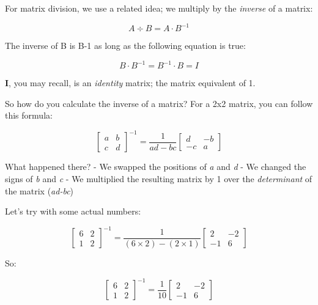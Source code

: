 \documentclass[11pt]{article}
\begin{document}
For matrix division, we use a related idea; we multiply by the
\emph{inverse} of a matrix:

\begin{equation}A \div B = A \cdot B^{-1}\end{equation}

The inverse of B is B-1 as long as the following equation is true:

\begin{equation}B \cdot B^{-1} = B^{-1} \cdot B = I\end{equation}

\textbf{I}, you may recall, is an \emph{identity} matrix; the matrix
equivalent of 1.

So how do you calculate the inverse of a matrix? For a 2x2 matrix, you
can follow this formula:

\begin{equation}\begin{bmatrix}a & b\\c & d\end{bmatrix}^{-1} = \frac{1}{ad-bc}  \begin{bmatrix}d & -b\\-c & a\end{bmatrix}\end{equation}

What happened there? - We swapped the positions of \emph{a} and \emph{d}
- We changed the signs of \emph{b} and \emph{c} - We multiplied the
resulting matrix by 1 over the \emph{determinant} of the matrix
(\emph{ad-bc})

Let's try with some actual numbers:

\begin{equation}\begin{bmatrix}6 & 2\\1 & 2\end{bmatrix}^{-1} = \frac{1}{(6\times2)-(2\times1)}  \begin{bmatrix}2 & -2\\-1 & 6\end{bmatrix}\end{equation}

So:

\begin{equation}\begin{bmatrix}6 & 2\\1 & 2\end{bmatrix}^{-1} = \frac{1}{10}  \begin{bmatrix}2 & -2\\-1 & 6\end{bmatrix}\end{equation}
\end{document}

